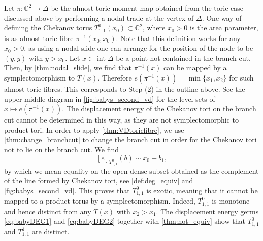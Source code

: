 \documentclass[12pt,a4paper,abstract=true,final]{scrartcl}
\DeclareMathOperator{\interior}{int}
\begin{document}
Let $\pi \colon \mathbb{C}^2 \rightarrow \Delta$ be the almost toric moment map obtained from the toric case discussed above by performing a nodal trade at the vertex of $\Delta$.
One way of defining the Chekanov torus $T^0_{1,1}(x_0) \subset \mathbb{C}^2$, where $x_0 > 0$ is the area parameter, is as almost toric fibre $\pi^{-1}(x_0,x_0)$.
Note that this definition works for any $x_0 >0$, as using a nodal slide one can arrange for the position of the node to be $(y,y)$ with $y > x_0$.
Let $x \in \interior\Delta$ be a point not contained in the branch cut.
Then, by \cref{thm:nodal_slide}, we find that $\pi^{-1}(x)$ can be mapped by a symplectomorphism to $T(x)$.
Therefore $e(\pi^{-1}(x)) = \min \{x_1,x_2\}$ for such almost toric fibres.
This corresponds to Step (2) in the outline above.
See the upper middle diagram in \cref{fig:babys_second_vd} for the level sets of $x \mapsto e(\pi^{-1}(x))$.
The displacement energy of the Chekanov tori on the branch cut cannot be determined in this way, as they are not symplectomorphic to product tori.
In order to apply \cref{thm:VDtoricfibre}, we use \cref{thm:change_branchcut} to change the branch cut in order for the Chekanov tori not to lie on the branch cut.
We find
\begin{equation}
    \label{eq:babyDEG2}
    [e]_{T^0_{1,1}}(b) \sim x_0 + b_1,
\end{equation}
by which we mean equality on the open dense subset obtained as the complement of the line formed by Chekanov tori, see \cref{def:deg_equiv} and \cref{fig:babys_second_vd}.
This proves that $T^0_{1,1}$ is exotic, meaning that it cannot be mapped to a product torus by a symplectomorphism.
Indeed, $T^0_{1,1}$ is monotone and hence distinct from any $T(x)$ with $x_2 > x_1$.
The displacement energy germs \eqref{eq:babyDEG1} and \eqref{eq:babyDEG2} together with \cref{thm:not_equiv} show that $T^0_{1,1}$ and $T^1_{1,1}$ are distinct. 
\end{document}
